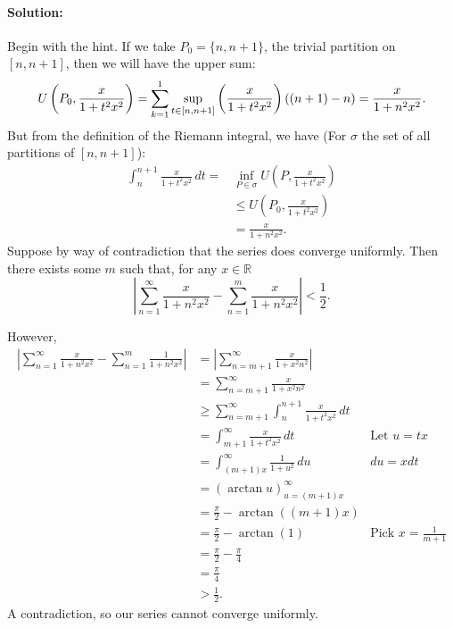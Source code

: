 \documentclass{article}
\begin{document}
\begin{enumerate}
  \paragraph{Solution: }Begin with the hint. If we take $P_{0}=\{n,n+1\} $, the trivial partition on $[n,n+1]$, then we will have the upper sum:
  \[
       U\left(P_0,\frac{x}{1+t^2x^2}\right)=\sum_{k=1}^{1} \sup_{t\in [n,n+1]}\left( \frac{x}{1+t^2x^2} \right) ((n+1)-n)\\
       = \frac{x}{1+n^2x^2} \\
  .\] 
  But from the definition of the Riemann integral, we have (For $\sigma$ the set of all partitions of $[n,n+1]$):
  \begin{align*}
      \int_{n}^{n+1} \frac{x}{1+t^2x^2} \, d t=&\inf_{P\in \sigma}U\left(P,\frac{x}{1+t^2x^2}\right)\\
                        &\leq U\left( P_0,\frac{x}{1+t^2x^2} \right) \\
      &= \frac{x}{1+n^2x^2}
  .\end{align*}
  Suppose by way of contradiction that the series does converge uniformly. Then there exists some $m$ such that, for any $x\in \mathbb{R}$
  \[
  \left| \sum_{n=1}^{\infty} \frac{x}{1+n^2x^2}-\sum_{n=1}^{m} \frac{x}{1+n^2x^2} \right| <\frac{1}{2}
  .\] 

  However,
  \begin{align*}
      \left| \sum_{n=1}^{\infty} \frac{x}{1+n^2x^2}-\sum_{n=1}^{m} \frac{1}{1+n^2x^2} \right| &= \left| \sum_{n=m+1}^{\infty} \frac{x}{1+x^2n^2} \right|  \\
                  &=\sum_{n=m+1}^{\infty} \frac{x}{1+x^2n^2}\\
                  &\geq \sum_{n=m+1}^{\infty} \int_{n}^{n+1} \frac{x}{1+t^2x^2} \, d t \\
                    &= \int_{m+1}^{\infty} \frac{x}{1+t^2x^2} \, d t &\text{Let }u=tx \\
                    &= \int_{(m+1)x}^{\infty} \frac{1}{1+u^2} \, d u &du=xdt \\
                    &= \left( \arctan u \right)_{u=(m+1)x}^{\infty} \\
                    &= \frac{\pi}{2}-\arctan ((m+1)x)\\
                    &= \frac{\pi}{2}-\arctan(1) &\text{Pick }x=\frac{1}{m+1} \\
                    &= \frac{\pi}{2}-\frac{\pi}{4} \\
                    &= \frac{\pi}{4}\\
                    & >\frac{1}{2}
  .\end{align*}
A contradiction, so our series cannot converge uniformly.
\end{enumerate}
\end{document}
